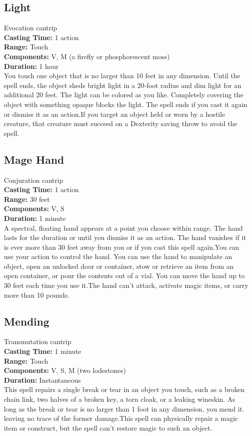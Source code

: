 \documentclass[11pt, A4paper, english]{article}
\begin{document}
		\subsection{Light}
Evocation cantrip \\
\textbf{Casting Time:} 1 action \\
\textbf{Range:} Touch \\
\textbf{Components:} V, M (a firefly or phosphorescent moss) \\
\textbf{Duration:} 1 hour \\
You touch one object that is no larger than  10 feet in any dimension. Until the spell ends, the object sheds bright light in a 20-foot radius and dim light for an additional 20 feet. The light can be colored as you like. Completely covering the object with something opaque blocks the light. The spell ends if you cast it again or dismiss it as an action.If you target an object held or worn by a hostile creature, that creature must succeed on a Dexterity saving throw to avoid the spell.

		\subsection{Mage Hand}
Conjuration cantrip \\
\textbf{Casting Time:} 1 action \\
\textbf{Range:} 30 feet \\
\textbf{Components:} V, S \\
\textbf{Duration:} 1 minute \\
A spectral, floating hand appears at a point you choose within range. The hand lasts for the duration or until you dismiss it as an action. The hand vanishes if it is ever more than 30 feet away from you or if you cast this spell again.You can use your action to control the hand. You can use the hand to manipulate an object, open an unlocked door or container, stow or retrieve an item from an open container, or pour the contents out of a vial. You can move the hand up to 30 feet each time you use it.The hand can’t attack, activate magic items, or carry more than 10 pounds.

		\subsection{Mending}
Transmutation cantrip \\
\textbf{Casting Time:} 1 minute \\
\textbf{Range:} Touch \\
\textbf{Components:} V, S, M (two lodestones) \\
\textbf{Duration:} Instantaneous \\
This spell repairs a single break or tear in an object you touch, such as a broken chain link, two halves of a broken key, a torn cloak, or a leaking wineskin. As long as the break or tear is no larger than  1  foot in any dimension, you mend it. leaving no trace of the former damage.This spell can physically repair a magic item or construct, but the spell can’t restore magic to such an object.
\end{document}
